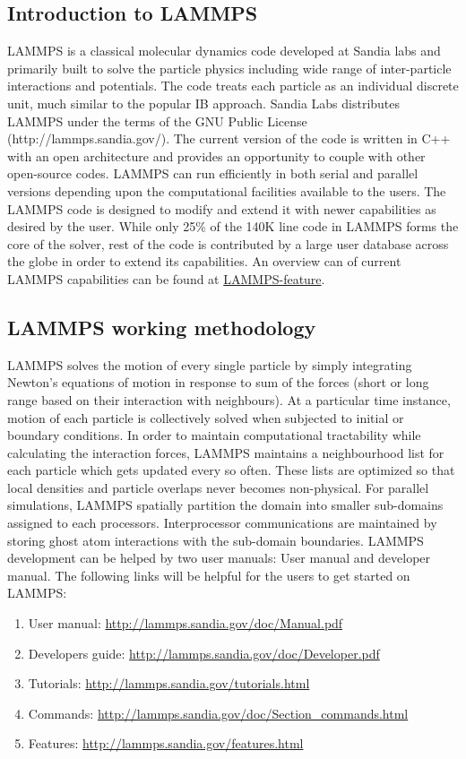 \documentclass[11pt,a4paper,openright]{article}
\begin{document}
\subsection{Introduction to LAMMPS}
LAMMPS is a classical molecular dynamics code developed at Sandia labs and primarily built to solve the particle physics including wide range of inter-particle interactions and potentials. The code treats each particle as an individual discrete unit, much similar to the popular IB approach. Sandia Labs distributes LAMMPS under the terms of the GNU Public License (http://lammps.sandia.gov/). The current version of the code is written in C++ with an open architecture and provides an opportunity to couple with other open-source codes. LAMMPS can run efficiently in both serial and parallel versions depending upon the computational facilities available to the users.  The LAMMPS code is designed to modify and extend it with newer capabilities as desired by the user. While only 25\% of the 140K line code in LAMMPS forms the core of the solver, rest of the code is contributed by a large user database across the globe in order to extend its capabilities. An overview can of current LAMMPS capabilities can be found at \href{http://lammps.sandia.gov/features.html}{LAMMPS-feature}.

\subsection{LAMMPS working methodology}
LAMMPS solves the motion of every single particle by simply integrating Newton's equations of motion in response to sum of the forces (short or long range based on their interaction with neighbours). At a particular time instance, motion of each particle is collectively solved when subjected to initial or boundary conditions. In order to maintain computational tractability while calculating the interaction forces, LAMMPS maintains a neighbourhood list for each particle which gets updated every so often. These lists are optimized so that local densities and particle overlaps never becomes non-physical. For parallel simulations, LAMMPS spatially partition the domain into smaller sub-domains assigned to each processors. Interprocessor communications are maintained by storing ghost atom interactions with the sub-domain boundaries. LAMMPS development can be helped by two user manuals: User manual and developer manual. The following links will be helpful for the users to get started on LAMMPS:

\begin{enumerate}
\item User manual: \url{http://lammps.sandia.gov/doc/Manual.pdf}
\item Developers guide: \url{http://lammps.sandia.gov/doc/Developer.pdf}
\item Tutorials: \url{http://lammps.sandia.gov/tutorials.html}
\item Commands: \url{http://lammps.sandia.gov/doc/Section_commands.html}
\item Features: \url{http://lammps.sandia.gov/features.html}
\end{enumerate}
\end{document}
